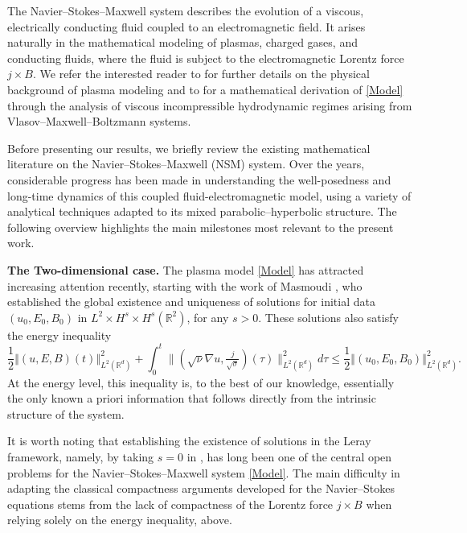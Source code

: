 \documentclass[11pt, leqno, a4paper,]{amsart}
\theoremstyle{remark}
\numberwithin{equation}{section}
\newcommand*{\norm}[1]{\left\Vert #1\right\Vert}
\begin{document}
The Navier--Stokes--Maxwell system describes the evolution of a viscous, electrically conducting fluid coupled to an electromagnetic field. It arises naturally in the mathematical modeling of plasmas, charged gases, and conducting fluids, where the fluid is subject to the electromagnetic Lorentz force $j\times B$.  
We refer the interested reader to \cite{bis-book,D-book} for further details on the physical background of plasma modeling and to \cite{as, JLZ23} for a mathematical derivation of \eqref{Model} through the analysis of viscous incompressible hydrodynamic regimes arising from Vlasov--Maxwell--Boltzmann systems.
 
Before presenting our results, we briefly review the existing mathematical literature on the Navier--Stokes--Maxwell (NSM) system. Over the years, considerable progress has been made in understanding the well-posedness and long-time dynamics of this coupled fluid-electromagnetic model, using a variety of analytical techniques adapted to its mixed parabolic--hyperbolic structure. The following overview highlights the main milestones most relevant to the present work.  

\medskip
\noindent\textbf{The Two-dimensional case.} 
 The plasma model   \eqref{Model} has attracted increasing attention recently, starting with the work of Masmoudi \cite{MN}, who established the global existence and uniqueness of solutions for initial data $(u_0,E_0,B_0)$ in $L^2\times H^s\times H^s(\mathbb R^2)$, for any $s>0$. These solutions also satisfy the energy inequality
\begin{equation}\label{energy:L2}
	\frac{1}{2}\norm {(u,E,B)(t)}_{L^2(\mathbb R^d)}^2 +  \int_{0}^t \|( \sqrt{ \nu} \nabla u, \tfrac{j}{\sqrt{\sigma}} )(\tau)\|_{L^2(\mathbb R^d)}^2d\tau   \leq \frac{1}{2}\norm {(u_0,E_0,B_0)}_{L^2(\mathbb R^d)}^2 .
\end{equation}
At the energy level, this inequality is, to the best of our knowledge, essentially the only  known a priori information that follows directly from the intrinsic structure of the system. 

It is worth noting that establishing the existence of solutions in the Leray framework, namely, by taking $s=0$ in \cite{MN}, has  long been one of the central open problems for the Navier--Stokes--Maxwell system  \eqref{Model}. The main difficulty in adapting the classical compactness arguments developed for the Navier--Stokes equations stems from the lack of compactness of the Lorentz force $j\times B$ when relying solely on the  energy inequality, above.
\end{document}
